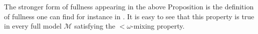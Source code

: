 \documentclass[11pt]{amsart}
\newcommand{\nphi}{\varphi}
\newcommand{\LL}{\mathcal{L}}
\theoremstyle{plain}
\theoremstyle{definition}
\theoremstyle{plain}
\theoremstyle{remark}
\newtheorem{remark}[theorem]{Remark}
\newcommand{\M}{\mathcal{M}}
\newcommand{\bool}[1]{\mathsf{#1}}
\newcommand{\cp}[1]{\left( #1 \right)}
\newcommand{\Qp}[1]{\left\llbracket #1 \right\rrbracket}
\newcommand{\bp}[1]{\left\lbrace #1 \right\rbrace}
\newcommand{\0}{\mathsf{0}}
\renewcommand{\1}{\mathsf{1}}
\renewcommand{\2}{\mathsf{2}}
\theoremstyle{definition}
\begin{document}
The stronger form of fullness appearing in the above Proposition is the definition of fullness one can find for instance in \cite{JECH}. It is easy to see that this property is true in every full model $\M$ satisfying the $<\omega$-mixing property.
\end{document}
